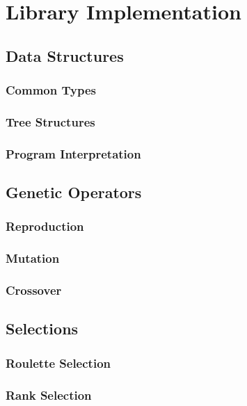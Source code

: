 \chapter{Library Implementation}
\todo

\section{Data Structures}
\todo

\subsection{Common Types}
\todo

\subsection{Tree Structures}
\todo

\subsection{Program Interpretation}
\todo

\section{Genetic Operators}
\todo

\subsection{Reproduction}
\todo

\subsection{Mutation}
\todo

\subsection{Crossover}
\todo

\section{Selections}
\todo

\subsection{Roulette Selection}
\todo

\subsection{Rank Selection}
\todo

